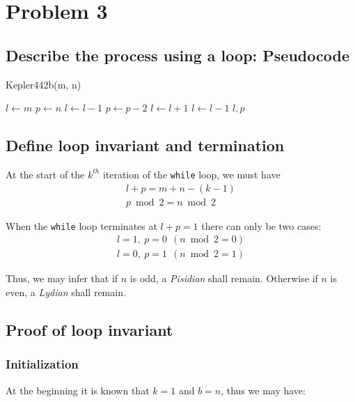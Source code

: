 \documentclass[12pt]{article}
\newcommand{\inlinecode}{\texttt}
\begin{document}
\section{Problem 3}
\subsection{Describe the process using a loop: Pseudocode}

\begin{algorithm}
\caption{Kepler442b(m, n)}\label{Kepler442b}
\begin{algorithmic}[1]
\Procedure{}{}
\State $l \gets m$
\State $p \gets n$
    \State {}
        \State $l \gets l - 1$
        \State $p \gets p - 2$
        \State $l \gets l + 1$
    \Else
        \State $l \gets l - 1$
    \EndIf
\EndWhile
\State \Return $l, p$
\EndProcedure
\end{algorithmic}
\end{algorithm}

\subsection{Define loop invariant and termination}
At the start of the $k^{th}$ iteration of the \inlinecode{while} loop, we must have
\begin{gather}
    l + p = m + n - (k - 1) \\
    p\bmod 2 = n \bmod 2
\end{gather}

When the \inlinecode{while} loop terminates at $l + p = 1$ there can only be two cases:
\begin{gather}
    l = 1, \ p = 0 \ \ (n \bmod 2 = 0) \\
    l = 0, \ p = 1 \ \ (n \bmod 2 = 1)
\end{gather}

Thus, we may infer that if $n$ is odd, a \textit{Pisidian} shall remain. Otherwise if $n$ is even, a \textit{Lydian} shall remain.

\subsection{Proof of loop invariant}
\subsubsection{Initialization}
At the beginning it is known that $k = 1$ and $b = n$, thus we may have:
\end{document}
